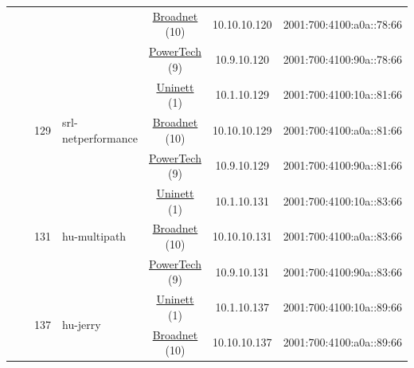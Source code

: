\begin{small}
\begin{center}
\begin{longtable}{|c|c|c|c|c|c|c|c|}
  &  &  &  & \multicolumn{2}{|c|}{\tiny{\href{https://www.broadnet.no}{Broadnet} (10)}} & \tiny{10.10.10.120} & \tiny{2001:700:4100:a0a::78:66} \\* \cline{5-5}\cline{6-6}\cline{7-7}\cline{8-8}
  &  &  &  & \multicolumn{2}{|c|}{\tiny{\href{http://www.powertech.no}{PowerTech} (9)}} & \tiny{10.9.10.120} & \tiny{2001:700:4100:90a::78:66} \\* \cline{3-3}\cline{4-4}\cline{5-5}\cline{6-6}\cline{7-7}\cline{8-8}
  &  & \multirow{3}{*}{\tiny{129}} & \multicolumn{1}{|l|}{\multirow{3}{*}{\tiny{srl-netperformance}}} & \multicolumn{2}{|c|}{\tiny{\href{https://www.uninett.no}{Uninett} (1)}} & \tiny{10.1.10.129} & \tiny{2001:700:4100:10a::81:66} \\* \cline{5-5}\cline{6-6}\cline{7-7}\cline{8-8}
  &  &  &  & \multicolumn{2}{|c|}{\tiny{\href{https://www.broadnet.no}{Broadnet} (10)}} & \tiny{10.10.10.129} & \tiny{2001:700:4100:a0a::81:66} \\* \cline{5-5}\cline{6-6}\cline{7-7}\cline{8-8}
  &  &  &  & \multicolumn{2}{|c|}{\tiny{\href{http://www.powertech.no}{PowerTech} (9)}} & \tiny{10.9.10.129} & \tiny{2001:700:4100:90a::81:66} \\* \cline{3-3}\cline{4-4}\cline{5-5}\cline{6-6}\cline{7-7}\cline{8-8}
  &  & \multirow{3}{*}{\tiny{131}} & \multicolumn{1}{|l|}{\multirow{3}{*}{\tiny{hu-multipath}}} & \multicolumn{2}{|c|}{\tiny{\href{https://www.uninett.no}{Uninett} (1)}} & \tiny{10.1.10.131} & \tiny{2001:700:4100:10a::83:66} \\* \cline{5-5}\cline{6-6}\cline{7-7}\cline{8-8}
  &  &  &  & \multicolumn{2}{|c|}{\tiny{\href{https://www.broadnet.no}{Broadnet} (10)}} & \tiny{10.10.10.131} & \tiny{2001:700:4100:a0a::83:66} \\* \cline{5-5}\cline{6-6}\cline{7-7}\cline{8-8}
  &  &  &  & \multicolumn{2}{|c|}{\tiny{\href{http://www.powertech.no}{PowerTech} (9)}} & \tiny{10.9.10.131} & \tiny{2001:700:4100:90a::83:66} \\* \cline{3-3}\cline{4-4}\cline{5-5}\cline{6-6}\cline{7-7}\cline{8-8}
  &  & \multirow{3}{*}{\tiny{137}} & \multicolumn{1}{|l|}{\multirow{3}{*}{\tiny{hu-jerry}}} & \multicolumn{2}{|c|}{\tiny{\href{https://www.uninett.no}{Uninett} (1)}} & \tiny{10.1.10.137} & \tiny{2001:700:4100:10a::89:66} \\* \cline{5-5}\cline{6-6}\cline{7-7}\cline{8-8}
  &  &  &  & \multicolumn{2}{|c|}{\tiny{\href{https://www.broadnet.no}{Broadnet} (10)}} & \tiny{10.10.10.137} & \tiny{2001:700:4100:a0a::89:66} \\* \cline{5-5}\cline{6-6}\cline{7-7}\cline{8-8}

\end{longtable}
\end{center}
\end{small}
